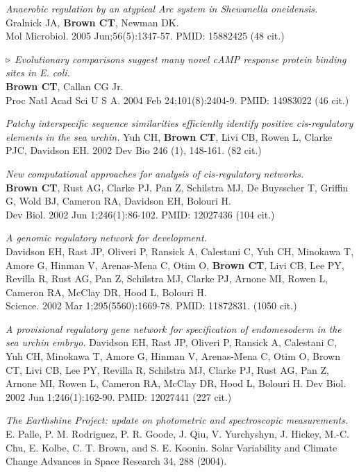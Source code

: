 \documentclass[margin,line]{resume}
\begin{document}
\begin{resume}
{\em Anaerobic regulation by an
atypical Arc system in {\em Shewanella oneidensis}.}\\
Gralnick JA, {\bf Brown CT}, Newman DK.\\
Mol Microbiol. 2005
Jun;56(5):1347-57.  PMID: 15882425 (48 cit.)

{\color{red} ${\bf \triangleright}$}
{\em Evolutionary comparisons suggest
many novel cAMP response protein binding sites in {\em E. coli}.}\\
{\bf Brown CT}, Callan CG Jr.\\
Proc Natl Acad Sci U S A. 2004 Feb 24;101(8):2404-9.  PMID: 14983022 (46 cit.)

{\em Patchy interspecific sequence similarities efficiently identify positive cis-regulatory elements in the sea urchin.}
Yuh CH, {\bf Brown CT}, Livi CB, Rowen L, Clarke PJC, Davidson EH.
2002 Dev Bio 246 (1), 148-161. (82 cit.)

  {\em New
computational approaches for analysis of {\em cis}-regulatory networks.}  \\
{\bf Brown CT}, Rust AG, Clarke PJ, Pan Z, Schilstra MJ, De Buysscher
T, Griffin G, Wold BJ, Cameron RA, Davidson EH, Bolouri H.\\
Dev Biol. 2002 Jun 1;246(1):86-102.  PMID: 12027436 (104 cit.)

{\em A genomic
regulatory network for development.}\\
Davidson EH, Rast JP, Oliveri P, Ransick A, Calestani C, Yuh CH,
Minokawa T, Amore G, Hinman V, Arenas-Mena C, Otim O, {\bf Brown CT}, Livi
CB, Lee PY, Revilla R, Rust AG, Pan Z, Schilstra MJ, Clarke PJ, Arnone
MI, Rowen L, Cameron RA, McClay DR, Hood L, Bolouri H.
\\Science. 2002 Mar
1;295(5560):1669-78.  PMID: 11872831. (1050 cit.)

{\em A provisional regulatory gene network for specification of endomesoderm in the sea urchin embryo.}
Davidson EH, Rast JP, Oliveri P, Ransick A, Calestani C, Yuh CH, Minokawa T, Amore G, Hinman V, Arenas-Mena C, Otim O, Brown CT, Livi CB, Lee PY, Revilla R, Schilstra MJ, Clarke PJ, Rust AG, Pan Z, Arnone MI, Rowen L, Cameron RA, McClay DR, Hood L, Bolouri H.
Dev Biol. 2002 Jun 1;246(1):162-90.
PMID: 12027441 (227 cit.)

{\em The Earthshine Project: update on photometric and spectroscopic measurements.}
 E. Palle, P. M. Rodriguez, P. R. Goode, J. Qiu, V. Yurchyshyn, J. Hickey, M.-C. Chu, E. Kolbe, C. T. Brown, and S. E. Koonin.
Solar Variability and Climate Change Advances in Space Research 34, 288 (2004).


\end{resume}
\end{document}
